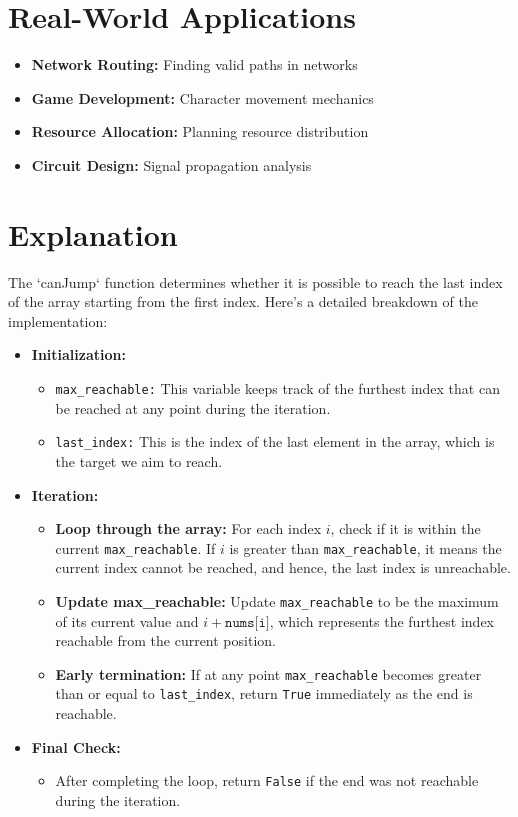 \section*{Real-World Applications}
\begin{itemize}
    \item \textbf{Network Routing:} Finding valid paths in networks
    \item \textbf{Game Development:} Character movement mechanics
    \item \textbf{Resource Allocation:} Planning resource distribution
    \item \textbf{Circuit Design:} Signal propagation analysis
\end{itemize}

\section*{Explanation}

The `canJump` function determines whether it is possible to reach the last index of the array starting from the first index. Here's a detailed breakdown of the implementation:

\begin{itemize}
    \item \textbf{Initialization:}
    \begin{itemize}
        \item \texttt{max\_reachable:} This variable keeps track of the furthest index that can be reached at any point during the iteration.
        \item \texttt{last\_index:} This is the index of the last element in the array, which is the target we aim to reach.
    \end{itemize}
    
    \item \textbf{Iteration:}
    \begin{itemize}
        \item \textbf{Loop through the array:} For each index \(i\), check if it is within the current \texttt{max\_reachable}. If \(i\) is greater than \texttt{max\_reachable}, it means the current index cannot be reached, and hence, the last index is unreachable.
        \item \textbf{Update max\_reachable:} Update \texttt{max\_reachable} to be the maximum of its current value and \(i + \texttt{nums[i]}\), which represents the furthest index reachable from the current position.
        \item \textbf{Early termination:} If at any point \texttt{max\_reachable} becomes greater than or equal to \texttt{last\_index}, return \texttt{True} immediately as the end is reachable.
    \end{itemize}
    
    \item \textbf{Final Check:}
    \begin{itemize}
        \item After completing the loop, return \texttt{False} if the end was not reachable during the iteration.
    \end{itemize}
\end{itemize}

